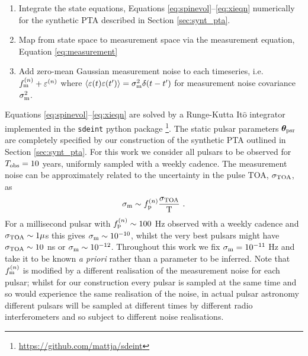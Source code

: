\documentclass[fleqn,usenatbib,useAMS]{mnras}
\begin{document}
\begin{enumerate}
	\item Integrate the state equations, Equations \eqref{eq:spinevol}--\eqref{eq:xieqn} numerically for the synthetic PTA described in Section \ref{sec:synt_pta}.
	\item Map from state space to measurement space via the measurement equation, Equation \eqref{eq:measurement}
	\item Add zero-mean Gaussian measurement noise to each timeseries, i.e. $f_{\rm m} ^{(n)} + \varepsilon^{(n)}$ where 	$\langle \varepsilon(t) \varepsilon(t') \rangle = \sigma_{\rm m}^2 \delta(t - t')$ for measurement noise covariance $\sigma_{\rm m}^2$.
\end{enumerate}
Equations \eqref{eq:spinevol}--\eqref{eq:xieqn} are solved by a Runge-Kutta It$\hat{\text{o}}$ integrator implemented in the \texttt{sdeint} python package \footnote{\url{https://github.com/mattja/sdeint}}. The static pulsar parameters  $\boldsymbol{\theta}_{\rm psr}$ are completely specified by our construction of the synthetic PTA outlined in Section \eqref{sec:synt_pta}. For this work we consider all pulsars to be observed for $T_{\rm obs} =10$ years, uniformly sampled with a weekly cadence. The measurement noise can be approximately related to the uncertainty in the pulse TOA, $\sigma_{\rm TOA}$, as
\begin{equation}
	\sigma_{\rm m} \sim f_{\rm p}^{(n)} \frac{\sigma_{\rm TOA}}{\text{T}} \ . 
\end{equation}
For a millisecond pulsar with $f_{\rm p}^{(n)} \sim 100$ Hz observed with a weekly cadence and $\sigma_{\rm TOA} \sim 1 \mu$s this gives $\sigma_{\rm m} \sim 10^{-10}$, whilst the very best pulsars might have $\sigma_{\rm TOA} \sim 10 $ ns or $\sigma_{\rm m} \sim 10^{-12}$. Throughout this work we fix $\sigma_{\rm m} = 10^{-11}$ Hz and take it to be known \textit{a priori} rather than a parameter to be inferred. Note that $f_{\rm m} ^{(n)}$ is modified by a different realisation of the measurement noise for each pulsar; whilst for our construction every pulsar is sampled at the same time and so would experience the same realisation of the noise, in actual pulsar astronomy different pulsars will be sampled at different times by different radio interferometers and so subject to different noise realisations. \newline 
\end{document}
